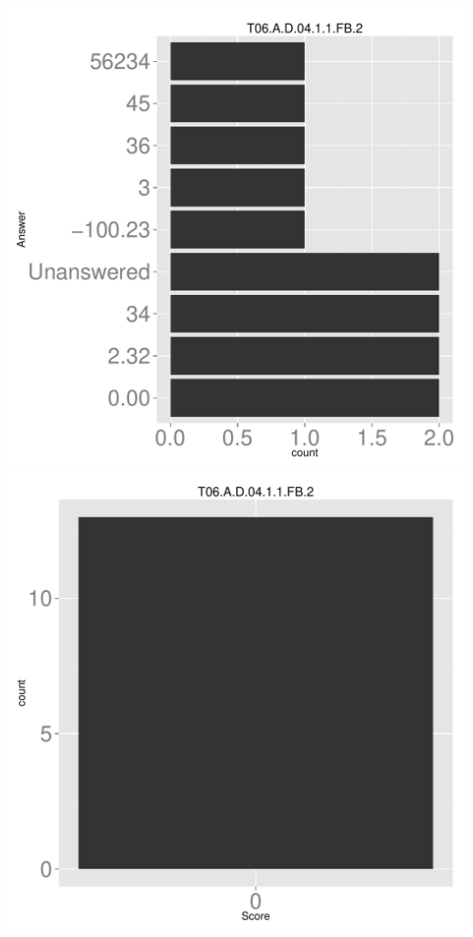 \documentclass[12pt,english,nohyper]{tufte-handout}\usepackage[]{graphicx}\usepackage[]{color}
\begin{document}
\begin{center} \includegraphics[width=.45\linewidth]{Topic06_AB_14_answer} \includegraphics[width=.45\linewidth]{Topic06_AB_14_score} \end{center} 
\end{document}
